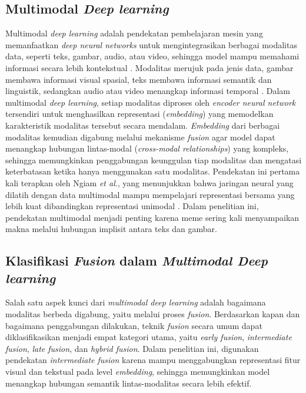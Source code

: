 \subsection{Multimodal \textit{Deep learning}} \label{II.teori7}
Multimodal \textit{deep learning} adalah pendekatan pembelajaran mesin yang memanfaatkan \textit{deep neural networks} untuk mengintegrasikan berbagai modalitas data, seperti teks, gambar, audio, atau video, sehingga model mampu memahami informasi secara lebih kontekstual \cite{ngiam2011multimodal}. Modalitas merujuk pada jenis data, gambar membawa informasi visual spasial, teks membawa informasi semantik dan linguistik, sedangkan audio atau video menangkap informasi temporal \cite{IBM2024multimodal}. Dalam multimodal \textit{deep learning}, setiap modalitas diproses oleh \textit{encoder neural network} tersendiri untuk menghasilkan representasi (\textit{embedding}) yang memodelkan karakteristik modalitas tersebut secara mendalam. \textit{Embedding} dari berbagai modalitas kemudian digabung melalui mekanisme \textit{fusion} agar model dapat menangkap hubungan lintas-modal (\textit{cross-modal relationships}) yang kompleks, sehingga memungkinkan penggabungan keunggulan tiap modalitas dan mengatasi keterbatasan ketika hanya menggunakan satu modalitas. Pendekatan ini pertama kali terapkan oleh Ngiam \textit{et al}., yang menunjukkan bahwa jaringan neural yang dilatih dengan data multimodal mampu mempelajari representasi bersama yang lebih kuat dibandingkan representasi unimodal \cite{ngiam2011multimodal}. Dalam penelitian ini, pendekatan multimodal menjadi penting karena meme sering kali menyampaikan makna melalui hubungan implisit antara teks dan gambar.


\subsection{Klasifikasi \textit{Fusion} dalam \textit{Multimodal Deep learning}} \label{II.teori8}
Salah satu aspek kunci dari \textit{multimodal deep learning} adalah bagaimana modalitas berbeda digabung, yaitu melalui proses \textit{fusion}. Berdasarkan kapan dan bagaimana penggabungan dilakukan, teknik \textit{fusion} secara umum dapat diklasifikasikan menjadi empat kategori utama, yaitu \textit{early fusion}, \textit{intermediate fusion}, \textit{late fusion}, dan \textit{hybrid fusion}. Dalam penelitian ini, digunakan pendekatan \textit{intermediate fusion} karena mampu menggabungkan representasi fitur visual dan tekstual pada level \textit{embedding}, sehingga memungkinkan model menangkap hubungan semantik lintas-modalitas secara lebih efektif.

